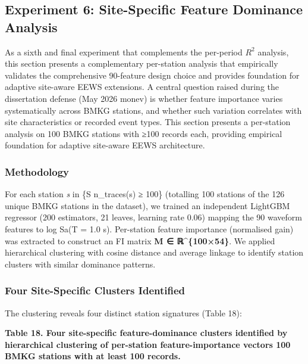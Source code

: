 \documentclass[10pt]{article}
\begin{document}
\subsection{Experiment 6: Site-Specific Feature Dominance Analysis}

As a sixth and final experiment that complements the per-period $R^2$ analysis, this section presents a complementary per-station analysis that empirically validates the comprehensive 90-feature design choice and provides foundation for adaptive site-aware EEWS extensions. A central question raised during the dissertation defense (May 2026 monev) is whether feature importance varies systematically across BMKG stations, and whether such variation correlates with site characteristics or recorded event types. This section presents a per-station analysis on 100 BMKG stations with ≥100 records each, providing empirical foundation for adaptive site-aware EEWS architecture.

\subsubsection{Methodology}

For each station \emph{s} in \{S \textbar{} n\_traces(s) ≥ 100\} (totalling 100 stations of the 126 unique BMKG stations in the dataset), we trained an independent LightGBM regressor (200 estimators, 21 leaves, learning rate 0.06) mapping the 90 waveform features to log Sa(T = 1.0 s). Per-station feature importance (normalised gain) was extracted to construct an FI matrix \textbf{M ∈ ℝ\^{}\{100×54\}}. We applied hierarchical clustering with cosine distance and average linkage to identify station clusters with similar dominance patterns.

\subsubsection{Four Site-Specific Clusters Identified}

The clustering reveals four distinct station signatures (Table 18):

\par\vspace{16pt}\noindent\begingroup\centering\fontsize{8}{10}\selectfont\textbf{Table 18. Four site-specific feature-dominance clusters identified by hierarchical clustering of per-station feature-importance vectors 100 BMKG stations with at least 100 records.}\par\endgroup\vspace{6pt}
\end{document}
